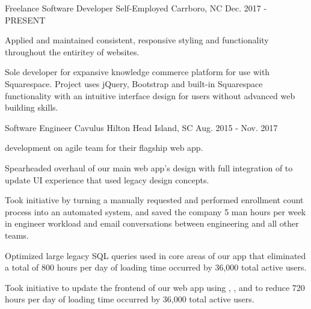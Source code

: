 

\begin{cventries}

  \cventry
    {Freelance Software Developer} %
    {Self-Employed} %
    {Carrboro, NC} %
    {Dec. 2017 - PRESENT} %
    {
      \begin{cvitems} %
        \item {Applied and maintained consistent, responsive  styling and functionality throughout the entiritey of  websites.}
        \item {Sole developer for expansive knowledge commerce platform for use with Squarespace. Project uses jQuery, Bootstrap and built-in Squarespace functionality with an intuitive interface design for users without advanced web building skills.}
      \end{cvitems}
    }

  \cventry
    {Software Engineer} %
    {Cavulus} %
    {Hilton Head Island, SC} %
    {Aug. 2015 - Nov. 2017} %
    {
      \begin{cvitems} %
        \item { development on agile team for their flagship web app.}
        \item {Spearheaded overhaul of our main web app's design with full integration of  to update UI experience that used legacy design concepts.}
        \item {Took initiative by turning a manually requested and performed enrollment count process into an automated system, and saved the company 5 man hours per week in engineer workload and email conversations between engineering and all other teams.}
        \item {Optimized large legacy SQL queries used in core areas of our app that eliminated a total of 800 hours per day of loading time occurred by 36,000 total active users.}
        \item {Took initiative to update the frontend of our web app using , , and  to reduce 720 hours per day of loading time occurred by 36,000 total active users.}
      \end{cvitems}
    }


\end{cventries}
